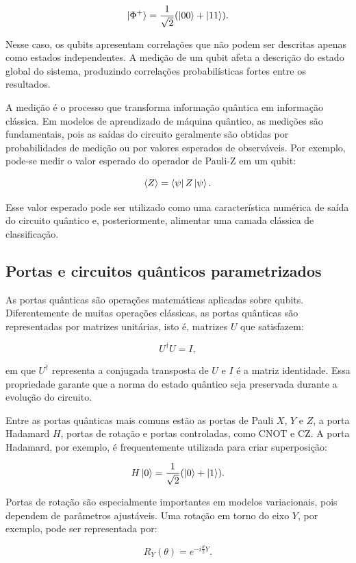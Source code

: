 \documentclass[
    12pt,
    openright,
    oneside,
    a4paper,
    english,
    brazil
]{abntex2}
\begin{document}
\[
\ket{\Phi^+} =
\frac{1}{\sqrt{2}}
(\ket{00} + \ket{11}).
\]

Nesse caso, os qubits apresentam correlações que não podem ser descritas apenas como estados independentes. A medição de um qubit afeta a descrição do estado global do sistema, produzindo correlações probabilísticas fortes entre os resultados.

A medição é o processo que transforma informação quântica em informação clássica. Em modelos de aprendizado de máquina quântico, as medições são fundamentais, pois as saídas do circuito geralmente são obtidas por probabilidades de medição ou por valores esperados de observáveis. Por exemplo, pode-se medir o valor esperado do operador de Pauli-Z em um qubit:

\[
\langle Z \rangle =
\bra{\psi} Z \ket{\psi}.
\]

Esse valor esperado pode ser utilizado como uma característica numérica de saída do circuito quântico e, posteriormente, alimentar uma camada clássica de classificação.

\subsection{Portas e circuitos quânticos parametrizados}

As portas quânticas são operações matemáticas aplicadas sobre qubits. Diferentemente de muitas operações clássicas, as portas quânticas são representadas por matrizes unitárias, isto é, matrizes \(U\) que satisfazem:

\[
U^\dagger U = I,
\]

em que \(U^\dagger\) representa a conjugada transposta de \(U\) e \(I\) é a matriz identidade. Essa propriedade garante que a norma do estado quântico seja preservada durante a evolução do circuito.

Entre as portas quânticas mais comuns estão as portas de Pauli \(X\), \(Y\) e \(Z\), a porta Hadamard \(H\), portas de rotação e portas controladas, como CNOT e CZ. A porta Hadamard, por exemplo, é frequentemente utilizada para criar superposição:

\[
H\ket{0} =
\frac{1}{\sqrt{2}}
(\ket{0} + \ket{1}).
\]

Portas de rotação são especialmente importantes em modelos variacionais, pois dependem de parâmetros ajustáveis. Uma rotação em torno do eixo \(Y\), por exemplo, pode ser representada por:

\[
R_Y(\theta) =
e^{-i\frac{\theta}{2}Y}.
\]
\end{document}
